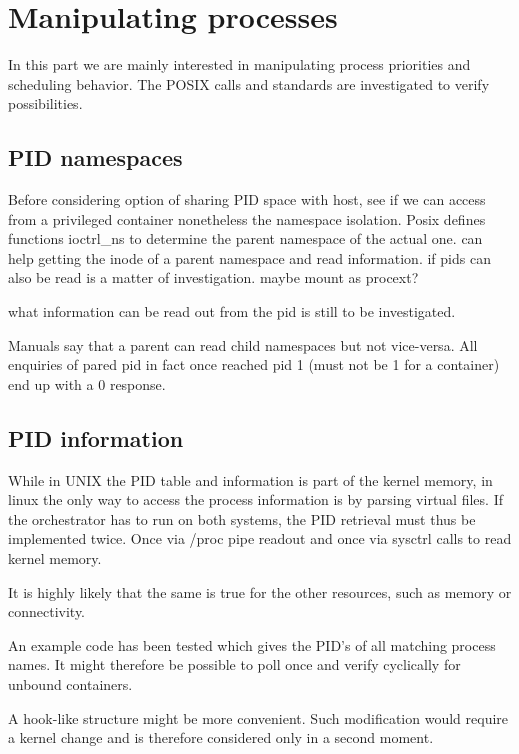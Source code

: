 \documentclass[]{scrartcl}
\begin{document}
\section{Manipulating processes}

In this part we are mainly interested in manipulating process priorities and scheduling behavior. 
The POSIX calls and standards are investigated to verify possibilities.

\subsection{PID namespaces}

Before considering option of sharing PID space with host, see if we can access from a privileged container nonetheless the namespace isolation. 
Posix defines functions ioctrl\_ns to determine the parent namespace of the actual one. can help getting the inode of a parent namespace and read information. 
if pids can also be read is a matter of investigation. maybe mount as \/procext?

what information can be read out from the pid is still to be investigated.

Manuals say that a parent can read child namespaces but not vice-versa. All enquiries of pared pid in fact once reached pid 1 (must not be 1 for a container) end up with a 0 response.

\subsection{PID information}
\label{sub:pidinf}

While in UNIX the PID table and information is part of the kernel memory, in linux the only way to access the process information is by parsing virtual files. 
If the orchestrator has to run on both systems, the PID retrieval must thus be implemented twice. Once via /proc pipe readout and once via sysctrl calls to read kernel memory.

It is highly likely that the same is true for the other resources, such as memory or connectivity. 

An example code has been tested which gives the PID's of all matching process names. 
It might therefore be possible to poll once and verify cyclically for unbound containers. 

A hook-like structure might be more convenient. Such modification would require a kernel change and is therefore considered only in a second moment.
\end{document}
